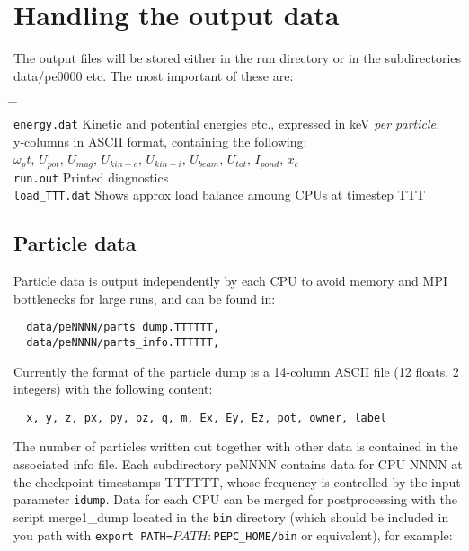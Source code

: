 \documentclass[11pt,psfig]{article}
\begin{document}
\section{Handling the output data \label{output}}

\noindent
The output files will be stored either in the run directory or in the
subdirectories data/pe0000 etc.  The most important of these are:

\begin{tabbing}
\hspace{1cm} \= \hspace{3cm} \= \hspace{1cm} \=\\
\> \texttt{energy.dat}  \>  Kinetic and potential energies etc., expressed in keV
\textit{per particle.} \\
\>  y-columns in ASCII format, containing the following:\\
\> \>         $\omega_pt$, $U_{pot}$, $U_{mag}$, $U_{kin-e}$, $U_{kin-i}$, 
$U_{beam}$, $U_{tot}$, $I_{pond}$, $x_c$\\

\> \texttt{run.out} \>         Printed diagnostics\\

\> \texttt{load_TTT.dat} \>   Shows approx load balance amoung CPUs at
timestep TTT
\end{tabbing}

\subsection{Particle data}

Particle data is output independently by each CPU to avoid memory and MPI
bottlenecks for large runs, and can be found in:

\begin{verbatim}
  data/peNNNN/parts_dump.TTTTTT,
  data/peNNNN/parts_info.TTTTTT,
\end{verbatim}

\noindent 
Currently the format of the particle dump is a 14-column ASCII file (12 floats,
2 integers) with the following content: 

\begin{verbatim}
  x, y, z, px, py, pz, q, m, Ex, Ey, Ez, pot, owner, label
\end{verbatim}

\noindent
The number of particles written out together with other data is contained in
the associated info file.  Each subdirectory peNNNN contains data for CPU NNNN at the checkpoint
timestamps TTTTTT, whose frequency is controlled by the input parameter
\texttt{idump}.  Data for each CPU can be merged for postprocessing with the script
merge1_dump located in the {\tt bin} directory (which should be included in
you path with {\tt export PATH=$PATH:$PEPC_HOME/bin} or equivalent), for example:
\end{document}
